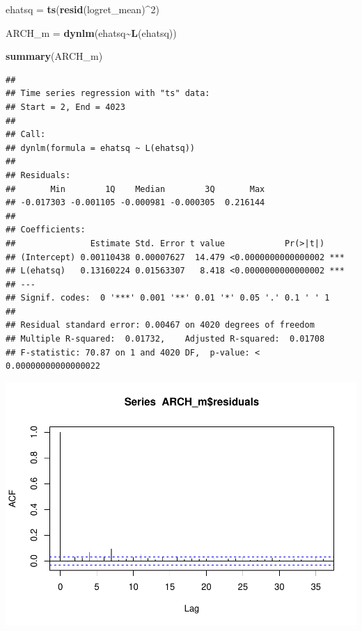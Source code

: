 \documentclass[
]{book}
\newenvironment{Shaded}{\begin{snugshade}}{\end{snugshade}}
\newcommand{\DecValTok}[1]{\textcolor[rgb]{0.00,0.00,0.81}{#1}}
\newcommand{\FunctionTok}[1]{\textcolor[rgb]{0.13,0.29,0.53}{\textbf{#1}}}
\newcommand{\NormalTok}[1]{#1}
\newcommand{\OtherTok}[1]{\textcolor[rgb]{0.56,0.35,0.01}{#1}}
\newcommand{\SpecialCharTok}[1]{\textcolor[rgb]{0.81,0.36,0.00}{\textbf{#1}}}
\begin{document}
\begin{Shaded}
\begin{Highlighting}[]
\NormalTok{ehatsq }\OtherTok{=} \FunctionTok{ts}\NormalTok{(}\FunctionTok{resid}\NormalTok{(logret\_mean)}\SpecialCharTok{\^{}}\DecValTok{2}\NormalTok{)}

\NormalTok{ARCH\_m }\OtherTok{=} \FunctionTok{dynlm}\NormalTok{(ehatsq}\SpecialCharTok{\textasciitilde{}}\FunctionTok{L}\NormalTok{(ehatsq))}

\FunctionTok{summary}\NormalTok{(ARCH\_m)}
\end{Highlighting}
\end{Shaded}

\begin{verbatim}
## 
## Time series regression with "ts" data:
## Start = 2, End = 4023
## 
## Call:
## dynlm(formula = ehatsq ~ L(ehatsq))
## 
## Residuals:
##       Min        1Q    Median        3Q       Max 
## -0.017303 -0.001105 -0.000981 -0.000305  0.216144 
## 
## Coefficients:
##               Estimate Std. Error t value            Pr(>|t|)    
## (Intercept) 0.00110438 0.00007627  14.479 <0.0000000000000002 ***
## L(ehatsq)   0.13160224 0.01563307   8.418 <0.0000000000000002 ***
## ---
## Signif. codes:  0 '***' 0.001 '**' 0.01 '*' 0.05 '.' 0.1 ' ' 1
## 
## Residual standard error: 0.00467 on 4020 degrees of freedom
## Multiple R-squared:  0.01732,    Adjusted R-squared:  0.01708 
## F-statistic: 70.87 on 1 and 4020 DF,  p-value: < 0.00000000000000022
\end{verbatim}

\begin{Shaded}
\end{Shaded}

\includegraphics{Notas-Series-Tiempo_files/figure-latex/ArchTest-1.pdf}
\end{document}
